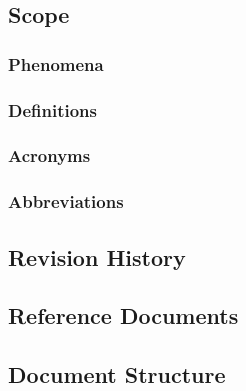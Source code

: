 \subsection{Scope}
\subsubsection{Phenomena}

\subsubsection{Definitions}
\subsubsection{Acronyms}
\subsubsection{Abbreviations}

\subsection{Revision History}

\subsection{Reference Documents}

\subsection{Document Structure}